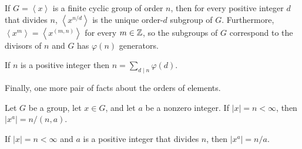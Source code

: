 \documentclass[../m171main.tex]{subfiles}
\begin{document}
\begin{theorem}[]
    If $G = \left< x \right>$ is a finite cyclic group of order $n$, then for every positive integer $d$ that divides $n$, $\left< x^{n / d} \right>$ is the unique order-$d$ subgroup of $G$.
    Furthermore, $\left< x^{m} \right> = \left< x^{(m,n)} \right>$ for every $m \in \mathbb{Z}$, so the subgroups of $G$ correspond to the divisors of $n$ and $G$ has $\varphi(n)$ generators.
\end{theorem}

\begin{corollary}[]
    If $n$ is a positive integer then $n = \sum_{d \mid n} \varphi(d)$.
\end{corollary}

Finally, one more pair of facts about the orders of elements.

\begin{theorem}[]
    Let $G$ be a group, let $x \in G$, and let $a$ be a nonzero integer.
    If $|x| = n < \infty$, then $|x^{a}| = n / (n,a)$.
\end{theorem}

\begin{corollary}[]
    If $|x| = n < \infty$ and $a$ is a positive integer that divides $n$, then $|x^{a}| = n / a$.
\end{corollary}
\end{document}
